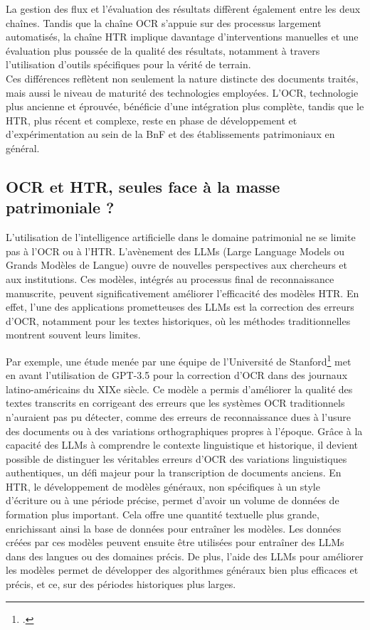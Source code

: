 \documentclass[a4paper,12pt,twoside]{book}
\begin{document}
	La gestion des flux et l'évaluation des résultats diffèrent également entre les deux chaînes. Tandis que la chaîne OCR s'appuie sur des processus largement automatisés, la chaîne HTR implique davantage d'interventions manuelles et une évaluation plus poussée de la qualité des résultats, notamment à travers l'utilisation d'outils spécifiques pour la vérité de terrain.
	\\
	
	Ces différences reflètent non seulement la nature distincte des documents traités, mais aussi le niveau de maturité des technologies employées. L'OCR, technologie plus ancienne et éprouvée, bénéficie d'une intégration plus complète, tandis que le HTR, plus récent et complexe, reste en phase de développement et d'expérimentation au sein de la BnF et des établissements patrimoniaux en général.
	\\
	
	\subsection{OCR et HTR, seules face à la masse patrimoniale ? }
	
	L'utilisation de l'intelligence artificielle dans le domaine patrimonial ne se limite pas à l'OCR ou à l'HTR. L'avènement des LLMs (Large Language Models ou Grands Modèles de Langue) ouvre de nouvelles perspectives aux chercheurs et aux institutions. Ces modèles, intégrés au processus final de reconnaissance manuscrite, peuvent significativement améliorer l'efficacité des modèles HTR. En effet, l’une des applications prometteuses des LLMs est la correction des erreurs d’OCR, notamment pour les textes historiques, où les méthodes traditionnelles montrent souvent leurs limites.
	
	Par exemple, une étude menée par une équipe de l’Université de Stanford\footcite{manrique-gomez_historical_2024} met en avant l’utilisation de GPT-3.5 pour la correction d’OCR dans des journaux latino-américains du XIXe siècle. Ce modèle a permis d’améliorer la qualité des textes transcrits en corrigeant des erreurs que les systèmes OCR traditionnels n’auraient pas pu détecter, comme des erreurs de reconnaissance dues à l’usure des documents ou à des variations orthographiques propres à l’époque. Grâce à la capacité des LLMs à comprendre le contexte linguistique et historique, il devient possible de distinguer les véritables erreurs d’OCR des variations linguistiques authentiques, un défi majeur pour la transcription de documents anciens.
	En HTR, le développement de modèles généraux, non spécifiques à un style d’écriture ou à une période précise, permet d’avoir un volume de données de formation plus important. Cela offre une quantité textuelle plus grande, enrichissant ainsi la base de données pour entraîner les modèles. Les données créées par ces modèles peuvent ensuite être utilisées pour entraîner des LLMs dans des langues ou des domaines précis. De plus, l'aide des LLMs pour améliorer les modèles permet de développer des algorithmes généraux bien plus efficaces et précis, et ce, sur des périodes historiques plus larges.
	
\end{document}
